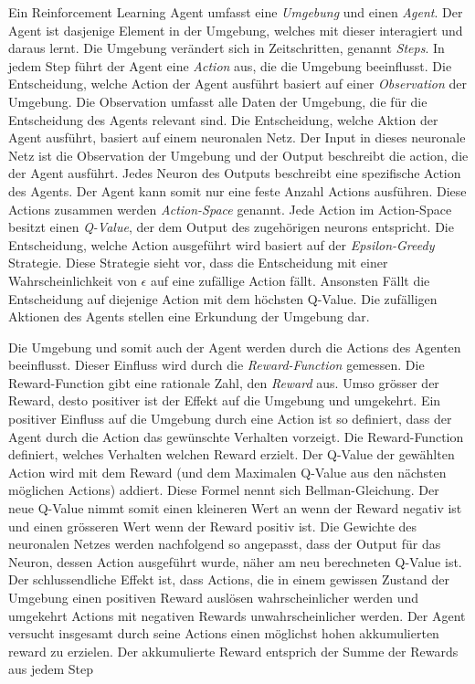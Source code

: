 Ein Reinforcement Learning Agent umfasst eine \emph{Umgebung} und einen
\emph{Agent}. Der Agent ist dasjenige Element in der Umgebung, welches mit
dieser interagiert und daraus lernt. Die Umgebung verändert sich in
Zeitschritten, genannt \emph{Steps}. In jedem Step führt der Agent eine
\emph{Action} aus, die die Umgebung beeinflusst. Die Entscheidung, welche Action
der Agent ausführt basiert auf einer \emph{Observation} der Umgebung. Die
Observation umfasst alle Daten der Umgebung, die für die Entscheidung des Agents
relevant sind. Die Entscheidung, welche Aktion der Agent ausführt, basiert auf
einem neuronalen Netz. Der Input in dieses neuronale Netz ist die Observation
der Umgebung und der Output beschreibt die action, die der Agent ausführt. Jedes
Neuron des Outputs beschreibt eine spezifische Action des Agents. Der Agent kann
somit nur eine feste Anzahl Actions ausführen. Diese Actions zusammen werden
\emph{Action-Space} genannt. Jede Action im Action-Space besitzt einen
\emph{Q-Value}, der dem Output des zugehörigen neurons entspricht. Die
Entscheidung, welche Action ausgeführt wird basiert auf der
\emph{Epsilon-Greedy} Strategie. Diese Strategie sieht vor, dass die
Entscheidung mit einer Wahrscheinlichkeit von $\epsilon$ auf eine zufällige
Action fällt. Ansonsten Fällt die Entscheidung auf diejenige Action mit dem
höchsten Q-Value. Die zufälligen Aktionen des Agents stellen eine Erkundung der
Umgebung dar.

Die Umgebung und somit auch der Agent werden durch die Actions des Agenten
beeinflusst. Dieser Einfluss wird durch die \emph{Reward-Function} gemessen. Die
Reward-Function gibt eine rationale Zahl, den \emph{Reward} aus. Umso grösser
der Reward, desto positiver ist der Effekt auf die Umgebung und umgekehrt. Ein
positiver Einfluss auf die Umgebung durch eine Action ist so definiert, dass der
Agent durch die Action das gewünschte Verhalten vorzeigt. Die Reward-Function
definiert, welches Verhalten welchen Reward erzielt. Der Q-Value der gewählten
Action wird mit dem Reward (und dem Maximalen Q-Value aus den nächsten möglichen
Actions) addiert. Diese Formel nennt sich Bellman-Gleichung. Der neue Q-Value          %
nimmt somit einen kleineren Wert an wenn der Reward negativ ist und einen
grösseren Wert wenn der Reward positiv ist. Die Gewichte des neuronalen Netzes
werden nachfolgend so angepasst, dass der Output für das Neuron, dessen Action
ausgeführt wurde, näher am neu berechneten Q-Value ist. Der schlussendliche
Effekt ist, dass Actions, die in einem gewissen Zustand der Umgebung einen
positiven Reward auslösen wahrscheinlicher werden und umgekehrt Actions mit
negativen Rewards unwahrscheinlicher werden. Der Agent versucht insgesamt durch
seine Actions einen möglichst hohen akkumulierten reward zu erzielen. Der
akkumulierte Reward entsprich der Summe der Rewards aus jedem Step

